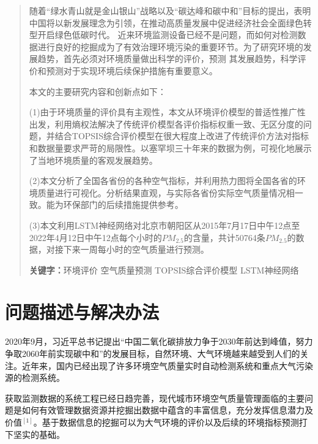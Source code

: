 \documentclass[UTF8]{ctexart}
\begin{document}
\newpage


\begin{abstract}
    随着“绿水青山就是金山银山”战略以及“碳达峰和碳中和”目标的提出，表明中国将以新发展理念为引领，在推动高质量发展中促进经济社会全面绿色转型开启绿色低碳时代。
近来环境监测设备已经不是问题，而如何对检测数据进行良好的挖掘成为了有效治理环境污染的重要环节。为了研究环境的发展趋势，首先必须对环境质量做出科学的评价，预测
其发展趋势，科学评价和预测对于实现环境后续保护措施有重要意义。

本文的主要研究内容和创新点如下：


(1)由于环境质量的评价具有主观性，本文从环境评价模型的普适性推广性出发，利用熵权法解决了传统评价模型各评价指标权重一致、无区分度的问题，并结合TOPSIS综合评价模型在很大程度上改进了传统评价方法对指标和数据量要求严苛的局限性。以塞罕坝三十年来的数据为例，可视化地展示了当地环境质量的客观发展趋势。

(2)本文分析了全国各省份的各种空气指标，并利用热力图将全国各省的环境质量进行可视化。分析结果直观，与实际各省份实际空气质量情况相一致。能为环保部门的后续措施提供参考。

(3)本文利用LSTM神经网络对北京市朝阳区从2015年7月17日中午12点至2022年4月12日中午12点每个小时的$PM_{2.5}$的含量，共计50764条$PM_{2.5}$的数据，对接下来一周每小时的空气质量进行预测。

\textbf{关键字：}环境评价 空气质量预测 TOPSIS综合评价模型 LSTM神经网络
\end{abstract}

\newpage
\tableofcontents
\newpage
\section{问题描述与解决办法}
2020年9月，习近平总书记提出“中国二氧化碳排放力争于2030年前达到峰值，努力争取2060年前实现碳中和”的发展目标，自然环境、大气环境越来越受到人们的关注。近年来，国内已经出现了许多环境空气质量实时自动检测系统和重点大气污染源的检测系统。

获取监测数据的系统工程已经日趋完善，现代城市环境空气质量管理面临的主要问题是如何有效管理数据资源并挖掘出数据中蕴含的丰富信息，充分发挥信息潜力及价值$^{[1]}$。基于数据信息的挖掘可以为大气环境的评价以及后续的环境指标预测打下坚实的基础。

\end{document}
